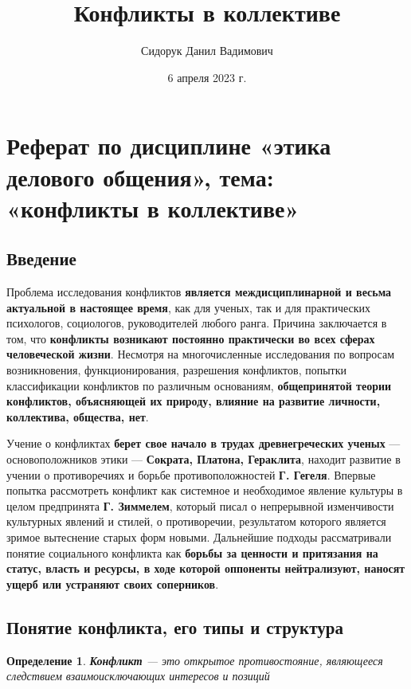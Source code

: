 \documentclass{article}
\title{Конфликты в коллективе}
\author{Сидорук Данил Вадимович}
\date{6 апреля 2023 г.}
\newtheorem{definition}{Определение}
\begin{document}
\raggedright

\maketitle
\tableofcontents
\pagebreak

\section{Реферат по дисциплине «этика делового общения», тема: «конфликты в коллективе»}

\subsection{Введение}

Проблема исследования конфликтов \textbf{является междисциплинарной и весьма актуальной в настоящее время}, как для ученых, так и для практических психологов, социологов, руководителей любого ранга. Причина заключается в том, что \textbf{конфликты возникают постоянно практически во всех сферах человеческой жизни}. Несмотря на многочисленные исследования по вопросам возникновения, функционирования, разрешения конфликтов, попытки классификации конфликтов по различным основаниям, \textbf{общепринятой теории конфликтов, объясняющей их природу, влияние на развитие личности, коллектива, общества, нет}.

\hfill

Учение о конфликтах \textbf{берет свое начало в трудах древнегреческих ученых} — основоположников этики — \textbf{Сократа, Платона, Гераклита}, находит развитие в учении о противоречиях и борьбе противоположностей \textbf{Г. Гегеля}. Впервые попытка рассмотреть конфликт как системное и необходимое явление культуры в целом предпринята \textbf{Г. Зиммелем}, который писал о непрерывной изменчивости культурных явлений и стилей, о противоречии, результатом которого является зримое вытеснение старых форм новыми. Дальнейшие подходы рассматривали понятие социального конфликта как \textbf{борьбы за ценности и притязания на статус, власть и ресурсы, в ходе которой оппоненты нейтрализуют,
наносят ущерб или устраняют своих соперников}.

\subsection{Понятие конфликта, его типы и структура}

\begin{definition}
\textbf{Конфликт} — это открытое противостояние, являющееся следствием взаимоисключающих интересов и позиций
\end{definition}
\end{document}
